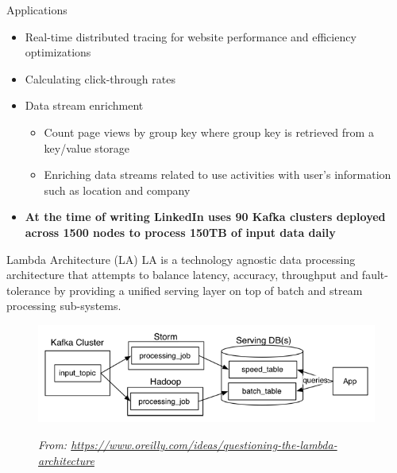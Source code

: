 \documentclass[newPxFont]{beamer}
\begin{document}
\begin{frame}[c]{Applications}

\begin{itemize}
	\item Real-time distributed tracing for website performance and efficiency optimizations
	\item Calculating click-through rates
	\item Data stream enrichment
	\begin{itemize}
		\item Count page views by group key where group key is retrieved from a key/value storage
		\item Enriching data streams related to use activities with user's information such as location and company
	\end{itemize}
	\item \textbf{At the time of writing LinkedIn uses 90 Kafka clusters deployed across 1500 nodes to process 150TB of input data daily}
\end{itemize}

\end{frame}


\begin{frame}[c]{Lambda Architecture (LA)}
LA is a technology agnostic data processing architecture that attempts to balance latency, accuracy, throughput and fault-tolerance by providing a unified serving layer on top of batch and stream processing sub-systems.   \\

\vspace{1em}

\begin{figure}
		\centering
		\includegraphics[width=0.75\linewidth]{lambda.png}
		\label{fig-lambda}
		\caption{\tiny\textit{From: \url{https://www.oreilly.com/ideas/questioning-the-lambda-architecture}}}
	\end{figure}

\end{frame}

\end{document}
